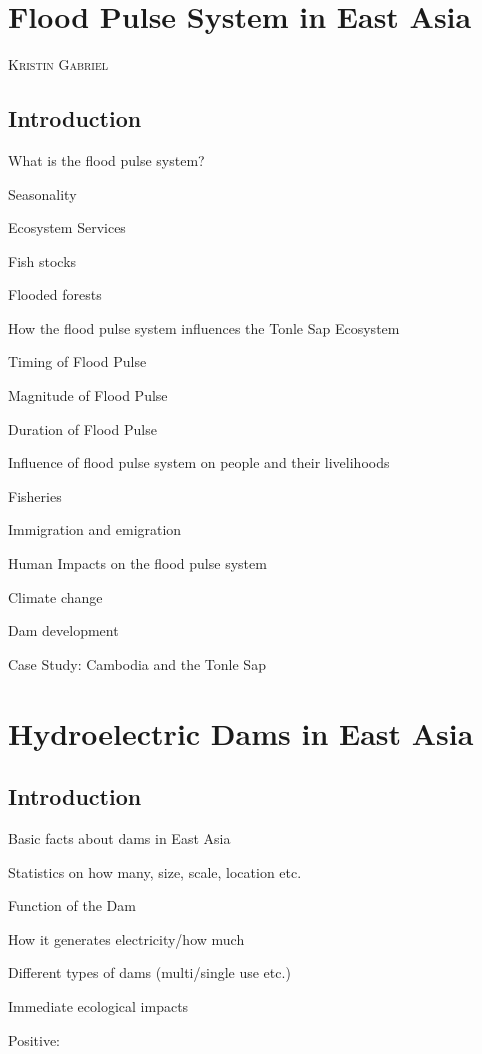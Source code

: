 \documentclass{book}\usepackage{knitr}
\makeatletter
\newcommand{\chapterauthor}[1]{%
  {\parindent0pt\vspace*{-25pt}%
  \linespread{1.1}\large\scshape#1%
  \par\nobreak\vspace*{35pt}}
  \@afterheading%
}
\makeatother
\begin{document}
\chapter{Flood Pulse System in East Asia}

\chapterauthor{Kristin Gabriel}

\section{Introduction}

What is the flood pulse system?

Seasonality

Ecosystem Services

Fish stocks

Flooded forests

How the flood pulse system influences the Tonle Sap Ecosystem

Timing of Flood Pulse

Magnitude of Flood Pulse

Duration of Flood Pulse

Influence of flood pulse system on people and their livelihoods

Fisheries

Immigration and emigration

Human Impacts on the flood pulse system

Climate change

Dam development

Case Study: Cambodia and the Tonle Sap


\chapter{Hydroelectric Dams in East Asia}

\section{Introduction}

Basic facts about dams in East Asia


Statistics on how many, size, scale, location etc.

Function of the Dam 

How it generates electricity/how much

Different types of dams (multi/single use etc.) 

Immediate ecological impacts 

Positive: 
\end{document}
